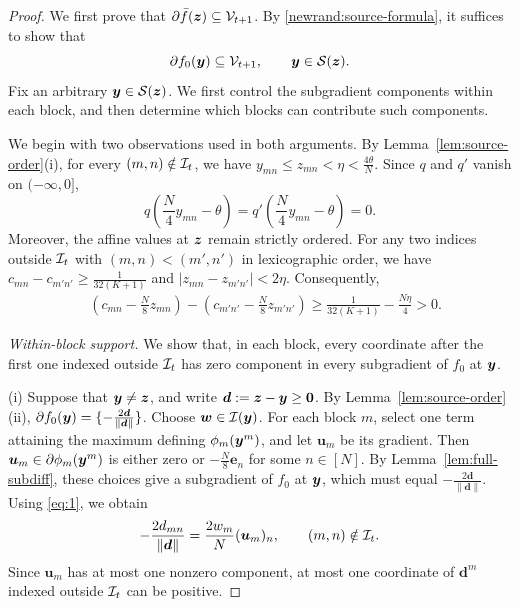 \begin{proof}
We first prove that $\partial \bar f(\bm{z})\subseteq{\cal V}_{t+1}$.
By \eqref{newrand:source-formula}, it suffices to show that
\[
 \partial f_0(\bm{y})\subseteq{\cal V}_{t+1},
 \qquad \bm{y}\in\mathcal S(\bm{z}).
\]
Fix an arbitrary $\bm{y}\in\mathcal S(\bm{z})$.
We first control the subgradient components within
each block, and then determine which blocks can
contribute such components.

We begin with two observations used in both arguments.
By Lemma~\ref{lem:source-order}(i), for every
$(m,n)\notin{\cal I}_t$, we have
$
 y_{mn}\le z_{mn}<\eta<\tfrac{4\theta}{N}.
$
Since $q$ and $q'$ vanish on $(-\infty,0]$,
\begin{equation}
\label{eq:1}
 q\left(\frac N4y_{mn}-\theta\right)
 =
 q'\left(\frac N4y_{mn}-\theta\right)
 =0.
\end{equation}
Moreover, the affine values at $\bm{z}$ remain strictly
ordered. {For any two indices outside ${\cal I}_t$ with
$(m,n)<(m',n')$ in lexicographic order, we have}
$c_{mn}-c_{m'n'}\ge\tfrac1{32(K+1)}$ and
$|z_{mn}-z_{m'n'}|<2\eta$. Consequently,
\begin{equation}
\begin{aligned}
 &\left(c_{mn}-\frac N8z_{mn}\right)
 -
 \left(c_{m'n'}-\frac N8z_{m'n'}\right)
 \ge
 \frac1{32(K+1)}-\frac{N\eta}{4}>0.
\end{aligned}
\label{eq:hidden-intercept-order}
\end{equation}

\emph{Within-block support.}
We show that, in each block, every coordinate
after the first one indexed outside ${\cal I}_t$
has zero component in every subgradient of
$f_0$ at $\bm{y}$.

\textrm{(i)} Suppose that $\bm{y}\ne\bm{z}$, and write
$\bm d:=\bm{z}-\bm{y}\ge{\mathbf 0}$.
By Lemma~\ref{lem:source-order}(ii),
$\partial f_0(\bm{y})=\{-\tfrac{2\bm d}{\|\bm d\|}\}$.
Choose $\bm w\in\mathcal I(\bm{y})$.
For each block $m$, select one term attaining
the maximum defining $\phi_m(\bm{y}^m)$, and let
$\bm u_m$ be its gradient.
Then $\bm u_m\in\partial\phi_m(\bm{y}^m)$ is either
zero or $-\tfrac N8\bm e_n$ for some $n\in[N]$.
By Lemma~\ref{lem:full-subdiff}, these choices
give a subgradient of $f_0$ at $\bm{y}$, which must
equal $-\tfrac{2\bm d}{\|\bm d\|}$.
Using \eqref{eq:1}, we obtain
\[
 -\frac{2d_{mn}}{\|\bm d\|}
 =
 \frac{2w_m}{N}(\bm u_m)_n,
 \qquad (m,n)\notin{\cal I}_t.
\]
Since $\bm u_m$ has at most one nonzero component,
at most one coordinate of $\bm d^m$ indexed
outside ${\cal I}_t$ can be positive.


\end{proof}
